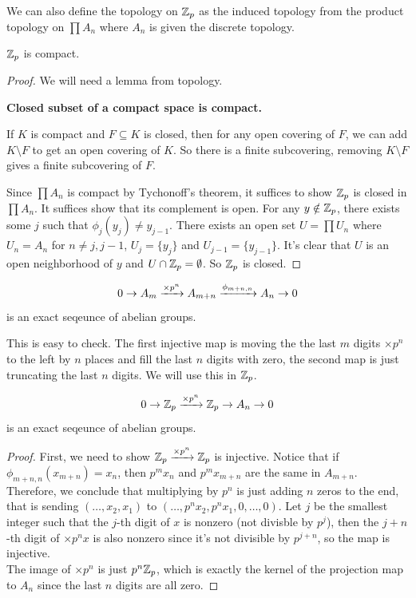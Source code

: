 \documentclass[15pt]{scrartcl}
\begin{document}
We can also define the topology on $\mathbb Z_p$ as the induced topology from the product topology on $\prod A_n$ where $A_n$ is given the discrete topology. 
\begin{theorem}
    $\mathbb Z_p$ is compact.
\end{theorem}
\begin{proof}
    We will need a lemma from topology. 
    \begin{lemma}
        \textbf{Closed subset of a compact space is compact.}
    \begin{subproof}
            If $K$ is compact and $F\subseteq K$ is closed, then for any open covering of $F$, we can add $K\setminus F$ to get an open covering of $K$. So there is a finite subcovering, removing $K\setminus F$ gives a finite subcovering of $F$.
        \end{subproof}
    \end{lemma}
    Since $\prod A_n$ is compact by Tychonoff's theorem, it suffices to show $\mathbb Z_p$ is closed in $\prod A_n$. It suffices show that its complement is open. For any $y\notin \mathbb Z_p$, there exists some $j$ such that $\phi_{j}(y_{j})\neq y_{j-1}$. There exists an open set $U=\prod U_n$ where $U_n=A_n$ for $n\neq j,j-1$, $U_j=\{y_j\}$ and $U_{j-1}=\{y_{j-1}\}$. It's clear that $U$ is an open neighborhood of $y$ and $U\cap \mathbb Z_p=\emptyset$. So $\mathbb Z_p$ is closed.
\end{proof}
\begin{theorem}
    \[0\to A_m \xrightarrow{\times p^n} A_{m+n} \xrightarrow{\phi_{m+n,n}} A_n \to 0\]
    is an exact seqeunce of abelian groups.
\end{theorem}
This is easy to check. The first injective map is moving the the last $m$ digits $\times p^n$ to the left by $n$ places and fill the last $n$ digits with zero, the second map is just truncating the last $n$ digits. We will use this in $\mathbb Z_p$.
\begin{theorem}
    \[0\to \mathbb Z_p \xrightarrow{\times p^n} \mathbb Z_p \to A_n \to 0 \]
    is an exact seqeunce of abelian groups.
\end{theorem}
\begin{proof}
    First, we need to show $\mathbb Z_p \xrightarrow{\times p^n} \mathbb Z_p$ is injective. Notice that if $\phi_{m+n,n}(x_{m+n})=x_n$, then $p^mx_n$ and $p^mx_{m+n}$ are the same in $A_{m+n}$. Therefore, we conclude that multiplying by $p^n$ is just adding $n$ zeros to the end, that is sending $(\ldots,x_2,x_1)$ to $(\ldots,p^nx_2,p^nx_1,0,\ldots,0)$. Let $j$ be the smallest integer such that the $j$-th digit of $x$ is nonzero (not divisble by $p^j$), then the $j+n$-th digit of $\times p^n x$ is also nonzero since it's not divisible by $p^{j+n}$, so the map is injective.
    \\

    The image of $\times p^n$ is just $p^n\mathbb Z_p$, which is exactly the kernel of the projection map to $A_n$ since the last $n$ digits are all zero.
\end{proof}
\end{document}
